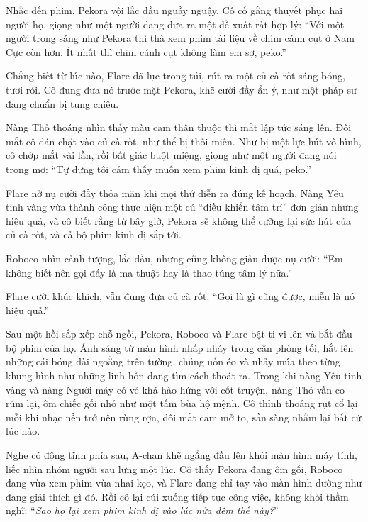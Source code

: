 \documentclass[../main.tex]{subfiles}
\begin{document}
Nhắc đến phim, Pekora vội lắc đầu nguầy nguậy. Cô cố gắng thuyết phục hai người họ, giọng như một người đang đưa ra một đề xuất rất hợp lý: ``Với một người trong sáng như Pekora thì thà xem phim tài liệu về chim cánh cụt ở Nam Cực còn hơn. Ít nhất thì chim cánh cụt không làm em sợ, peko.''

Chẳng biết từ lúc nào, Flare đã lục trong túi, rút ra một củ cà rốt sáng bóng, tươi rói. Cô đung đưa nó trước mặt Pekora, khẽ cười đầy ẩn ý, như một pháp sư đang chuẩn bị tung chiêu.


Nàng Thỏ thoáng nhìn thấy màu cam thân thuộc thì mắt lập tức sáng lên. Đôi mắt cô dán chặt vào củ cà rốt, như thể bị thôi miên. Như bị một lực hút vô hình, cô chớp mắt vài lần, rồi bất giác buột miệng, giọng như một người đang nói trong mơ: ``Tự dưng tôi cảm thấy muốn xem phim kinh dị quá, peko.''

Flare nở nụ cười đầy thỏa mãn khi mọi thứ diễn ra đúng kế hoạch. Nàng Yêu tinh vàng vừa thành công thực hiện một cú ``điều khiển tâm trí'' đơn giản nhưng hiệu quả, và cô biết rằng từ bây giờ, Pekora sẽ không thể cưỡng lại sức hút của củ cà rốt, và cả bộ phim kinh dị sắp tới.

Roboco nhìn cảnh tượng, lắc đầu, nhưng cũng không giấu được nụ cười: ``Em không biết nên gọi đấy là ma thuật hay là thao túng tâm lý nữa.''

Flare cười khúc khích, vẫn đung đưa củ cà rốt: ``Gọi là gì cũng được, miễn là nó hiệu quả.''

\ct

Sau một hồi sắp xếp chỗ ngồi, Pekora, Roboco và Flare bật ti-vi lên và bắt đầu bộ phim của họ. Ánh sáng từ màn hình nhấp nháy trong căn phòng tối, hắt lên những cái bóng dài ngoằng trên tường, chúng uốn éo và nhảy múa theo từng khung hình như những linh hồn đang tìm cách thoát ra. Trong khi nàng Yêu tinh vàng và nàng Người máy có vẻ khá hào hứng với cốt truyện, nàng Thỏ vẫn co rúm lại, ôm chiếc gối nhỏ như một tấm bùa hộ mệnh. Cô thỉnh thoảng rụt cổ lại mỗi khi nhạc nền trở nên rùng rợn, đôi mắt cam mở to, sẵn sàng nhắm lại bất cứ lúc nào.

Nghe có động tĩnh phía sau, A-chan khẽ ngẩng đầu lên khỏi màn hình máy tính, liếc nhìn nhóm người sau lưng một lúc. Cô thấy Pekora đang ôm gối, Roboco đang vừa xem phim vừa nhai kẹo, và Flare đang chỉ tay vào màn hình dường như đang giải thích gì đó. Rồi cô lại cúi xuống tiếp tục công việc, không khỏi thầm nghĩ: ``\textit{Sao họ lại xem phim kinh dị vào lúc nửa đêm thế này?}''
\end{document}
